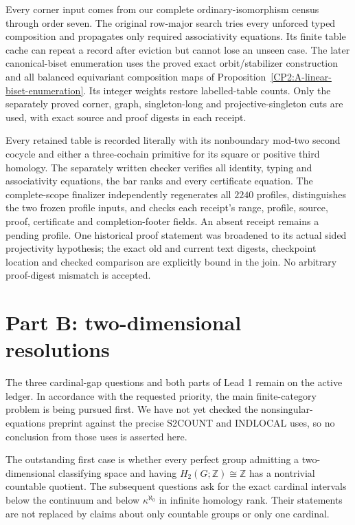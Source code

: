 \documentclass[11pt]{article}
\begin{document}
Every corner input comes from our complete ordinary-isomorphism census
through order seven. The original row-major search tries every unforced
typed composition and propagates only required associativity equations.
Its finite table cache can repeat a record after eviction but cannot
lose an unseen case. The later canonical-biset enumeration uses the
proved exact orbit/stabilizer construction and all balanced equivariant
composition maps of Proposition~\ref{CP2:A-linear-biset-enumeration}.
Its integer weights restore labelled-table counts. Only the separately
proved corner, graph, singleton-long and projective-singleton cuts are
used, with exact source and proof digests in each receipt.

Every retained table is recorded literally with its nonboundary mod-two
second cocycle and either a three-cochain primitive for its square or
positive third homology. The separately written checker verifies all
identity, typing and associativity equations, the bar ranks and every
certificate equation. The complete-scope finalizer independently
regenerates all $2240$ profiles, distinguishes the two frozen profile
inputs, and checks each receipt's range, profile, source, proof,
certificate and completion-footer fields. An absent receipt remains a
pending profile. One historical proof statement was broadened to its
actual sided projectivity hypothesis; the exact old and current text
digests, checkpoint location and checked comparison are explicitly bound
in the join. No arbitrary proof-digest mismatch is accepted.

\section{Part B: two-dimensional resolutions}
\label{CP2:partB}
The three cardinal-gap questions and both parts of Lead 1 remain on the
active ledger. In accordance with the requested priority, the main
finite-category problem is being pursued first. We have not yet checked
the nonsingular-equations preprint against the precise S2COUNT and
INDLOCAL uses, so no conclusion from those uses is asserted here.

The outstanding first case is whether every perfect group admitting a
two-dimensional classifying space and having $H_2(G;\mathbb Z)\cong
\mathbb Z$ has a nontrivial countable quotient. The subsequent questions
ask for the exact cardinal intervals below the continuum and below
$\kappa^{\aleph_0}$ in infinite homology rank. Their statements are not
replaced by claims about only countable groups or only one cardinal.
\end{document}
